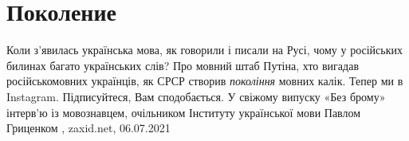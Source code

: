  
 
 
 
 
\chapter{Поколение}

Коли з’явилась українська мова, як говорили і писали на Русі, чому у російських
билинах багато українських слів? Про мовний штаб Путіна, хто вигадав
російськомовних українців, як СРСР створив \emph{покоління} мовних калік.
Тепер ми в Instagram. Підписуйтеся, Вам сподобається.  У свіжому випуску «Без
брому» інтерв’ю із мовознавцем, очільником Інституту української мови Павлом
Гриценком
, 
zaxid.net, 06.07.2021

